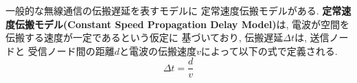 \indent 一般的な無線通信の伝搬遅延を表すモデルに
定常速度伝搬モデルがある. 
\textbf{定常速度伝搬モデル(Constant Speed Propagation Delay Model)}は, 
電波が空間を伝搬する速度が一定であるという仮定に
基づいており, 伝搬遅延$\Delta t$は, 送信ノードと
受信ノード間の距離$d$と電波の伝搬速度$v$によって以下の式で定義される.
\[
  \Delta t = \frac{d}{v}
\]